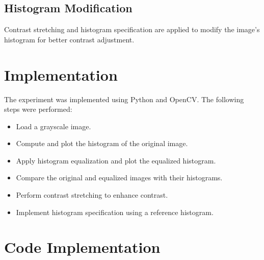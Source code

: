 \documentclass{report}
\begin{document}
\subsection{Histogram Modification}
Contrast stretching and histogram specification are applied to modify the image’s histogram for better contrast adjustment.

\section{Implementation}
The experiment was implemented using Python and OpenCV. The following steps were performed:

\begin{itemize}
    \item Load a grayscale image.
    \item Compute and plot the histogram of the original image.
    \item Apply histogram equalization and plot the equalized histogram.
    \item Compare the original and equalized images with their histograms.
    \item Perform contrast stretching to enhance contrast.
    \item Implement histogram specification using a reference histogram.
\end{itemize}

\section{Code Implementation}

\end{document}
